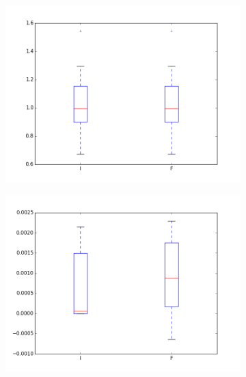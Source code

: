 \begin{figure}
    \centering
    \begin{subfigure}[b]{0.3\textwidth}
        \includegraphics[scale=0.25]{images/boxplot_same_mean.png} 
        \caption{}
        \label{sub box 1}
    \end{subfigure}
    \begin{subfigure}[b]{0.3\textwidth}
        \includegraphics[scale=0.25]{images/boxplot_noconvergence.png} 
        \caption{}
        \label{sub box 2}
    \end{subfigure}
    \begin{subfigure}[b]{0.3\textwidth}

\end{subfigure}
\end{figure}
